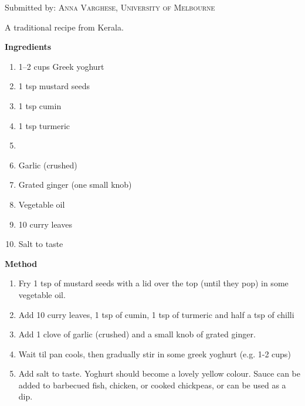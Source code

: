 

Submitted by: \textsc{Anna Varghese, University of Melbourne}


\begin{shadequote*}
A traditional recipe from Kerala.
\end{shadequote*}
\hrulefill

\textbf{Ingredients}

\begin{enumerate}[before=\itshape,font=\normalfont]
\item 1--2 cups Greek yoghurt
\item 1 tsp mustard seeds
\item 1 tsp cumin
\item 1 tsp turmeric
\item \textonehalf
\item Garlic (crushed)
\item Grated ginger (one small knob)
\item Vegetable oil
\item 10 curry leaves
\item Salt to taste
\end{enumerate}

\hrulefill

\textbf{Method}

\begin{enumerate}
\item Fry 1 tsp of mustard seeds with a lid over the top  (until they pop) in some vegetable oil. 
\item Add 10 curry leaves, 1 tsp of cumin, 1 tsp of turmeric and half a tsp of chilli 
\item Add 1 clove of garlic (crushed) and a small knob of grated ginger. 
\item Wait til pan cools, then gradually stir in some greek yoghurt (e.g. 1-2 cups)
\item Add salt to taste. Yoghurt should become a lovely yellow colour. Sauce can be added to barbecued fish, chicken, or cooked chickpeas, or can be used as a dip.
\end{enumerate}



